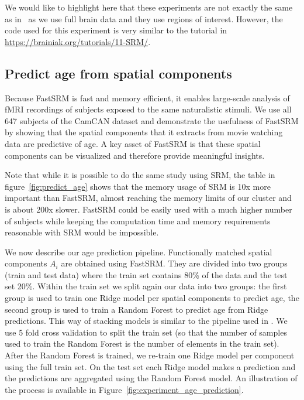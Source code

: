 We would like to highlight here that these experiments are not exactly the same
as in~\cite{chen2015reduced} as we use full brain data and they use regions of
interest. However, the code used for this experiment is very similar to the tutorial in \url{https://brainiak.org/tutorials/11-SRM/}.

\subsection{Predict age from spatial components}
Because FastSRM is fast and memory efficient, it enables large-scale analysis of fMRI recordings of subjects exposed to the same naturalistic stimuli.
% 
We use all 647 subjects of the CamCAN dataset and demonstrate the usefulness of FastSRM by showing that the spatial components that it extracts from movie watching data are predictive of age.
% 
A key asset of FastSRM is that these spatial components can be visualized and therefore provide meaningful insights. 

Note that while it is possible to do the same study using SRM, the
table in figure~\ref{fig:predict_age} shows that the memory usage of
SRM is 10x more important than FastSRM, almost reaching the memory
limits of our cluster and is about 200x slower. FastSRM could be
easily used with a much higher number of subjects while keeping the computation
time and memory requirements reasonable with SRM would be impossible.

We now describe our age prediction pipeline.
Functionally matched spatial components $A_i$ are obtained using FastSRM.
%
They are divided into two groups (train and test data) where the train set contains 80\% of the data and the test set 20\%.
%
Within the train set we split again our data into two groups: the first group is
used to train one Ridge model per spatial components to predict age, the second group is used to train a Random Forest to predict age from Ridge predictions. This way of stacking models is similar to the pipeline used in \cite{rahim2017joint}.
%
We use 5 fold cross validation to split the train set (so that the number of samples used to train the Random Forest is the number of elements in the train set).
%
After the Random Forest is trained, we re-train one Ridge model per component using the full
train set.
%
On the test set each Ridge model makes a prediction and the predictions are aggregated using the Random Forest model.
%
An illustration of the process is available in Figure~\ref{fig:experiment_age_prediction}. 

